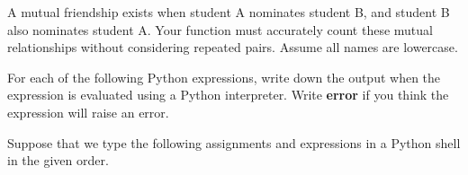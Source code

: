 \documentclass[12pt]{exam}
\begin{document}
\begin{questions}
A mutual friendship exists when student A nominates student B, and student B also nominates student A.
Your function must accurately count these mutual relationships without considering repeated pairs. Assume
all names are lowercase.


\newpage
\color{gray}
\question For each of the following Python expressions, write down the output when the expression is evaluated using a Python interpreter. Write \textbf{error} if you think the expression will raise an error.


\question Suppose that we type the following assignments and expressions in a Python
shell in the given order. 


\end{questions}
\end{document}
